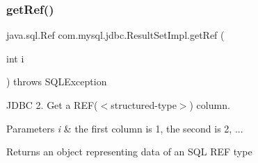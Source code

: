 \subsubsection{\texorpdfstring{get\+Ref()}{getRef()}\hspace{0.1cm}{\footnotesize\ttfamily [1/2]}}
{\footnotesize\ttfamily java.\+sql.\+Ref com.\+mysql.\+jdbc.\+Result\+Set\+Impl.\+get\+Ref (\begin{DoxyParamCaption}\item[{int}]{i }\end{DoxyParamCaption}) throws S\+Q\+L\+Exception}

J\+D\+BC 2. Get a R\+EF($<$structured-\/type$>$) column.


\begin{DoxyParams}{Parameters}
{\em i} & the first column is 1, the second is 2, ...\\
\hline
\end{DoxyParams}
\begin{DoxyReturn}{Returns}
an object representing data of an S\+QL R\+EF type
\end{DoxyReturn}

